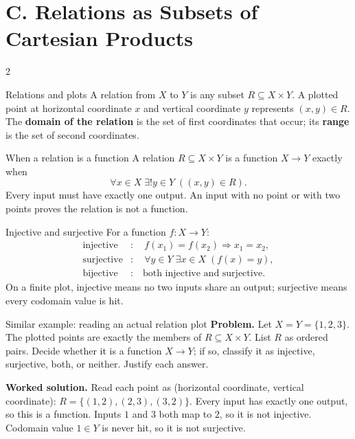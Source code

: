 \documentclass[10pt]{article}
\newcommand{\term}[1]{\textbf{\color{CoreNavy}#1}}
\begin{document}
\section*{C. Relations as Subsets of Cartesian Products}
\begin{multicols}{2}
\begin{definitionbox}{Relations and plots}
A relation from $X$ to $Y$ is any subset $R\subseteq X\times Y$. A plotted
point at horizontal coordinate $x$ and vertical coordinate $y$ represents
$(x,y)\in R$. The \term{domain of the relation} is the set of first
coordinates that occur; its \term{range} is the set of second coordinates.
\end{definitionbox}

\begin{definitionbox}{When a relation is a function}
A relation $R\subseteq X\times Y$ is a function $X\to Y$ exactly when
\[
\forall x\in X\;\exists!y\in Y\;((x,y)\in R).
\]
Every input must have exactly one output. An input with no point or with two
points proves the relation is not a function.
\end{definitionbox}

\begin{definitionbox}{Injective and surjective}
For a function $f:X\to Y$:
\begin{align*}
\text{injective}&:\quad f(x_1)=f(x_2)\Rightarrow x_1=x_2,\\
\text{surjective}&:\quad \forall y\in Y\;\exists x\in X\;(f(x)=y),\\
\text{bijective}&:\quad \text{both injective and surjective.}
\end{align*}
On a finite plot, injective means no two inputs share an output; surjective
means every codomain value is hit.
\end{definitionbox}

\begin{workedbox}{Similar example: reading an actual relation plot}
\textbf{Problem.} Let $X=Y=\{1,2,3\}$. The plotted points are exactly the
members of $R\subseteq X\times Y$. List $R$ as ordered pairs. Decide whether
it is a function $X\to Y$; if so, classify it as injective, surjective, both,
or neither. Justify each answer.
\begin{center}
\end{center}
\textbf{Worked solution.} Read each point as (horizontal coordinate, vertical
coordinate): $R=\{(1,2),(2,3),(3,2)\}$. Every input has exactly one output,
so this is a function. Inputs $1$ and $3$ both map to $2$, so it is not
injective. Codomain value $1\in Y$ is never hit, so it is not surjective.


\end{workedbox}
\end{multicols}
\end{document}
